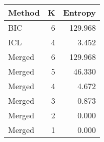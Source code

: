 \begin{center} 
\begin{tabular}{lrr}
 Method & K & Entropy \\ 
  \hline
\hline
BIC &    6 & 129.968 \\ 
  ICL &    4 & 3.452 \\ 
  Merged &    6 & 129.968 \\ 
  Merged &    5 & 46.330 \\ 
  Merged &    4 & 4.672 \\ 
  Merged &    3 & 0.873 \\ 
  Merged &    2 & 0.000 \\ 
  Merged &    1 & 0.000 \\ 
  \end{tabular}
\end{center} 
